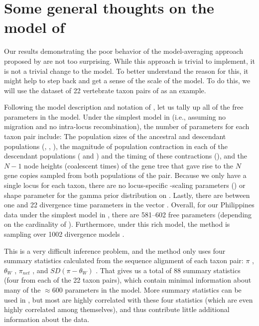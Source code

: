 \section*{Some general thoughts on the model of \msb}
Our results demonstrating the poor behavior of the model-averaging approach
proposed by \citet{Hickerson2013} are not too surprising.
While this approach is trivial to implement, it is not a trivial change
to the \msb model.
To better understand the reason for this, it might help to step back and get a
sense of the scale of the \msb model.
To do this, we will use the dataset of 22 vertebrate taxon pairs of
\citet{Oaks2012} as an example.

Following the model description and notation of \citet{Oaks2012}, let us tally
up all of the free parameters in the \msb model.  Under the simplest model in
\msb (i.e., assuming no migration and
no intra-locus recombination), the number of parameters for each
taxon pair include:
The population sizes of the ancestral and descendant populations
(\ancestralTheta{}, , ),
the magnitude of population contraction in each of the descendant
populations ( and ) and the
timing of these contractions (\bottleTime{}), and the $N-1$ node heights
(coalescent times) of the gene tree that gave rise to the $N$ gene
copies sampled from both populations of the pair.
Because we only have a single locus for each taxon, there are no locus-specific
\myTheta{}-scaling parameters (\locusMutationRateScalar{}) or
\locusRateHetShapeParameter shape parameter for the gamma prior distribution on
\locusMutationRateScalar{}.
Lastly, there are between one and 22 divergence time parameters \divt{} in
the vector \divtvector.
Overall, for our Philippines data under the simplest model in \msb, there are
581--602 free parameters (depending on the cardinality of \divtvector).
Furthermore, under this rich model, the method is sampling over 1002 divergence
models \citep[i.e., the number of integer partitions of $Y=22$;][]{Oaks2012}.

This is a very difficult inference problem, and the method only uses four
summary statistics calculated from the sequence alignment of each taxon pair:
$\pi$ \citep{Tajima1983}, $\theta_W$ \citep{Watterson1975}, $\pi_{net}$
\citep{Takahata1985}, and $SD(\pi-\theta_W)$ \citep{Tajima1989}.
That gives us a total of 88 summary statistics (four from each of the 22 taxon
pairs), which contain minimal information about many of the $\approx 600$
parameters in the model.
More summary statistics can be used in \msb, but most are highly correlated
with these four statistics (which are even highly correlated among themselves),
and thus contribute little additional information about the data.

